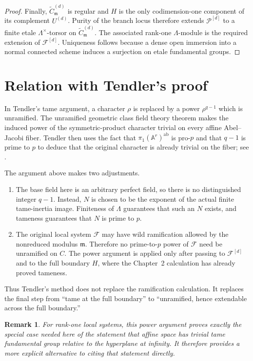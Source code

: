 \documentclass[11pt]{article}
\newtheorem{remark}{Remark}
\newcommand{\A}{\mathbb A}
\newcommand{\F}{\mathcal F}
\newcommand{\cP}{\mathcal P}
\newcommand{\m}{\mathfrak m}
\begin{document}
\begin{proof}
Finally, $\widetilde C^{(d)}_{\m}$ is regular and $H$ is the only
codimension-one component of its complement $U^{(d)}$.  Purity of the
branch locus therefore extends $\cP^{[d]}$ to a finite etale
$\Lambda^\times$-torsor on $\widetilde C^{(d)}_{\m}$.  The associated
rank-one $\Lambda$-module is the required extension of $\F^{[d]}$.
Uniqueness follows because a dense open immersion into a normal connected
scheme induces a surjection on etale fundamental groups.
\end{proof}

\section{Relation with Tendler's proof}

In Tendler's tame argument, a character $\rho$ is replaced by a power
$\rho^{q-1}$ which is unramified.  The unramified geometric class field
theory theorem makes the induced power of the symmetric-product character
trivial on every affine Abel--Jacobi fiber.  Tendler then uses the fact that
$\pi_1(\A^r)^{\mathrm{ab}}$ is pro-$p$ and that $q-1$ is prime to $p$ to
deduce that the original character is already trivial on the fiber; see
\cite[\S9.3]{Tendler}.

The argument above makes two adjustments.

\begin{enumerate}
 \item The base field here is an arbitrary perfect field, so there is no
 distinguished integer $q-1$.  Instead, $N$ is chosen to be the exponent of
 the actual finite tame-inertia image.  Finiteness of $\Lambda$ guarantees
 that such an $N$ exists, and tameness guarantees that $N$ is prime to $p$.

 \item The original local system $\F$ may have wild ramification allowed by
 the nonreduced modulus $\m$.  Therefore no prime-to-$p$ power of $\F$ need
 be unramified on $C$.  The power argument is applied only after passing to
 $\F^{[d]}$ and to the full boundary $H$, where the Chapter~2 calculation
 has already proved tameness.
\end{enumerate}

Thus Tendler's method does not replace the ramification calculation.  It
replaces the final step from ``tame at the full boundary'' to ``unramified,
hence extendable across the full boundary.''

\begin{remark}
For rank-one local systems, this power argument proves exactly the special
case needed here of the statement that affine space has trivial tame
fundamental group relative to the hyperplane at infinity.  It therefore
provides a more explicit alternative to citing that statement directly.
\end{remark}
\end{document}
